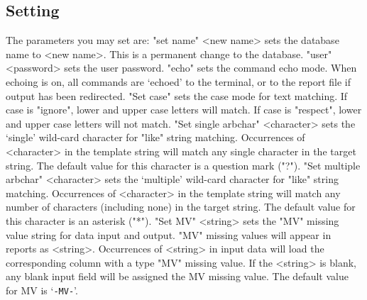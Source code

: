 \subsection{Setting}
The parameters you may set are:
%
\label{set}
\<"set name" <new name>\>
sets the database name to <new name>.
This is a permanent change to the database.
%
%
\label{ucmd-section}
\< "user" <password>\>
sets the user password.
%
\label{echo-mode}
\< "echo" \>
sets the command echo mode.  When echoing is on, all commands
are `echoed' to the terminal, or to the report file if
output has been redirected.
%
\<"Set case" \>
sets the case mode for text matching.
If case is "ignore",
lower and upper case letters will match.
If case is "respect",
lower and upper case letters will not match.
%
\<"Set single arbchar" <character>\>
sets the `single' wild-card character for "like" string matching.
Occurrences of <character> in the template string will match
any single character in the target string.
The default value for this character is a question mark ("?").
%
\<"Set multiple arbchar" <character>\>
sets the `multiple' wild-card character for "like" string matching.
Occurrences of <character> in the template string will match
any number of characters (including none) in the target string.
The default value for this character is an asterisk ("*").
%
\<"Set MV" <string>\>
sets the "MV" missing value string for data input and output.
"MV" missing values will appear in reports as <string>.
Occurrences of <string> in input data will load the corresponding
column with a type "MV" missing value.
If the <string> is blank, any blank input field will
be assigned the MV missing value.
The default value for MV is `{\tt-MV-}'.
 
